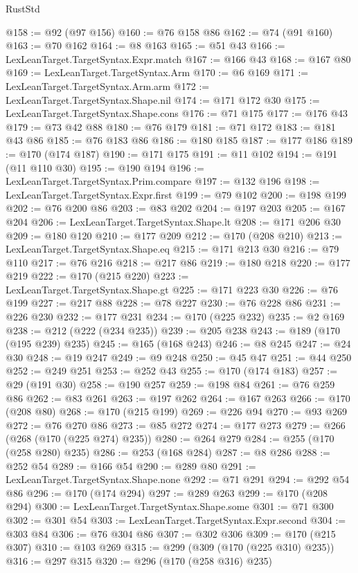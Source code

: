 \begin{lexlean}{RustStd}
\begin{coremodule}
@158 := @92 (@97 @156)
@160 := @76 @158 @86
@162 := @74 (@91 @160)
@163 := @70 @162
@164 := @8 @163
@165 := @51 @43
@166 := LexLeanTarget.TargetSyntax.Expr.match
@167 := @166 @43
@168 := @167 @80
@169 := LexLeanTarget.TargetSyntax.Arm
@170 := @6 @169
@171 := LexLeanTarget.TargetSyntax.Arm.arm
@172 := LexLeanTarget.TargetSyntax.Shape.nil
@174 := @171 @172 @30
@175 := LexLeanTarget.TargetSyntax.Shape.cons
@176 := @71 @175
@177 := @176 @43
@179 := @73 @42 @88
@180 := @76 @179
@181 := @71 @172
@183 := @181 @43 @86
@185 := @76 @183 @86
@186 := @180 @185
@187 := @177 @186
@189 := @170 (@174 @187)
@190 := @171 @175
@191 := @11 @102
@194 := @191 (@11 @110 @30)
@195 := @190 @194
@196 := LexLeanTarget.TargetSyntax.Prim.compare
@197 := @132 @196
@198 := LexLeanTarget.TargetSyntax.Expr.first
@199 := @79 @102
@200 := @198 @199
@202 := @76 @200 @86
@203 := @83 @202
@204 := @197 @203
@205 := @167 @204
@206 := LexLeanTarget.TargetSyntax.Shape.lt
@208 := @171 @206 @30
@209 := @180 @120
@210 := @177 @209
@212 := @170 (@208 @210)
@213 := LexLeanTarget.TargetSyntax.Shape.eq
@215 := @171 @213 @30
@216 := @79 @110
@217 := @76 @216
@218 := @217 @86
@219 := @180 @218
@220 := @177 @219
@222 := @170 (@215 @220)
@223 := LexLeanTarget.TargetSyntax.Shape.gt
@225 := @171 @223 @30
@226 := @76 @199
@227 := @217 @88
@228 := @78 @227
@230 := @76 @228 @86
@231 := @226 @230
@232 := @177 @231
@234 := @170 (@225 @232)
@235 := @2 @169
@238 := @212 (@222 (@234 @235))
@239 := @205 @238
@243 := @189 (@170 (@195 @239) @235)
@245 := @165 (@168 @243)
@246 := @8 @245
@247 := @24 @30
@248 := @19 @247
@249 := @9 @248
@250 := @45 @47
@251 := @44 @250
@252 := @249 @251
@253 := @252 @43
@255 := @170 (@174 @183)
@257 := @29 (@191 @30)
@258 := @190 @257
@259 := @198 @84
@261 := @76 @259 @86
@262 := @83 @261
@263 := @197 @262
@264 := @167 @263
@266 := @170 (@208 @80)
@268 := @170 (@215 @199)
@269 := @226 @94
@270 := @93 @269
@272 := @76 @270 @86
@273 := @85 @272
@274 := @177 @273
@279 := @266 (@268 (@170 (@225 @274) @235))
@280 := @264 @279
@284 := @255 (@170 (@258 @280) @235)
@286 := @253 (@168 @284)
@287 := @8 @286
@288 := @252 @54
@289 := @166 @54
@290 := @289 @80
@291 := LexLeanTarget.TargetSyntax.Shape.none
@292 := @71 @291
@294 := @292 @54 @86
@296 := @170 (@174 @294)
@297 := @289 @263
@299 := @170 (@208 @294)
@300 := LexLeanTarget.TargetSyntax.Shape.some
@301 := @71 @300
@302 := @301 @54
@303 := LexLeanTarget.TargetSyntax.Expr.second
@304 := @303 @84
@306 := @76 @304 @86
@307 := @302 @306
@309 := @170 (@215 @307)
@310 := @103 @269
@315 := @299 (@309 (@170 (@225 @310) @235))
@316 := @297 @315
@320 := @296 (@170 (@258 @316) @235)

\end{coremodule}
\end{lexlean}
